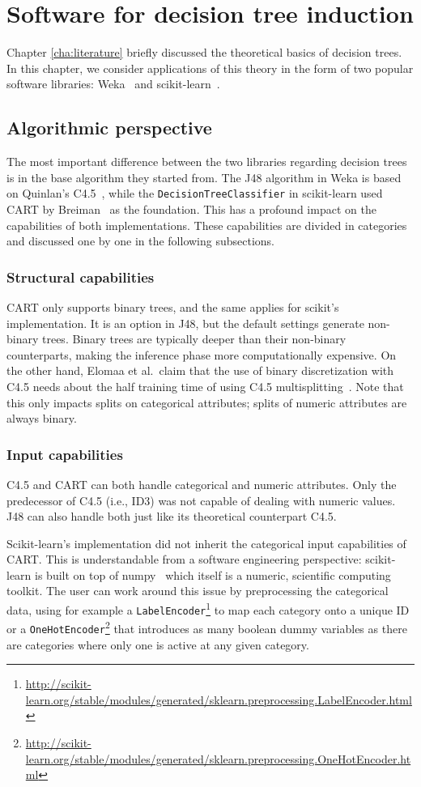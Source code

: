 \chapter{Software for decision tree induction}\label{cha:software}
Chapter \ref{cha:literature} briefly discussed the theoretical basics of decision trees. In this chapter, we consider applications of this theory in the form of two popular software libraries: Weka~\cite{eibe2016weka} and scikit-learn~\cite{scikit-learn}.

\section{Algorithmic perspective}
The most important difference between the two libraries regarding decision trees is in the base algorithm they started from. The J48 algorithm in Weka is based on Quinlan's C4.5~\cite{c45}, while the \texttt{DecisionTreeClassifier} in scikit-learn used CART by Breiman~\cite{cart} as the foundation. This has a profound impact on the capabilities of both implementations. These capabilities are divided in categories and discussed one by one in the following subsections.

\subsection{Structural capabilities}
CART only supports binary trees, and the same applies for scikit's implementation. It is an option in J48, but the default settings generate non-binary trees. Binary trees are typically deeper than their non-binary counterparts, making the inference phase more computationally expensive. On the other hand, Elomaa et al.\ claim that the use of binary discretization with C4.5 needs about the half training time of using C4.5 multisplitting~\cite{elomaa1999general}. Note that this only impacts splits on categorical attributes; splits of numeric attributes are always binary.

\subsection{Input capabilities}
C4.5 and CART can both handle categorical and numeric attributes. Only the predecessor of C4.5 (i.e., ID3) was not capable of dealing with numeric values. J48 can also handle both just like its theoretical counterpart C4.5.

Scikit-learn's implementation did not inherit the categorical input capabilities of CART. This is understandable from a software engineering perspective: scikit-learn is built on top of numpy~\cite{numpy} which itself is a numeric, scientific computing toolkit. The user can work around this issue by preprocessing the categorical data, using for example a \texttt{LabelEncoder}\footnote{\url{http://scikit-learn.org/stable/modules/generated/sklearn.preprocessing.LabelEncoder.html}} to map each category onto a unique ID or a \texttt{OneHotEncoder}\footnote{\url{http://scikit-learn.org/stable/modules/generated/sklearn.preprocessing.OneHotEncoder.html}} that introduces as many boolean dummy variables as there are categories where only one is active at any given category.

